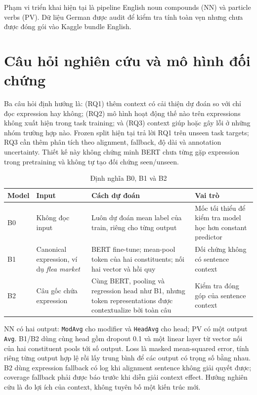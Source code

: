 \documentclass[11pt,a4paper]{article}
\newcommand{\code}[1]{\nolinkurl{#1}}
\begin{document}
Phạm vi triển khai hiện tại là pipeline English noun compounds (NN) và particle verbs (PV). Dữ liệu German được audit để kiểm tra tính toàn vẹn nhưng chưa được đóng gói vào Kaggle bundle English.

\section{Câu hỏi nghiên cứu và mô hình đối chứng}

Ba câu hỏi định hướng là: (RQ1) thêm context có cải thiện dự đoán so với chỉ đọc expression hay không; (RQ2) mô hình hoạt động thế nào trên expressions không xuất hiện trong task training; và (RQ3) context giúp hoặc gây lỗi ở những nhóm trường hợp nào. Frozen split hiện tại trả lời RQ1 trên unseen task targets; RQ3 cần thêm phân tích theo alignment, fallback, độ dài và annotation uncertainty. Thiết kế này không chứng minh BERT chưa từng gặp expression trong pretraining và không tự tạo đối chứng seen/unseen.

\begin{table}[htbp]
\centering
\caption{Định nghĩa B0, B1 và B2}
\small
\begin{tabularx}{\textwidth}{@{}p{}p{}YY@{}}
\toprule
Model & Input & Cách dự đoán & Vai trò \\
\midrule
B0 & Không đọc input & Luôn dự đoán mean label của train, riêng cho từng output & Mốc tối thiểu để kiểm tra model học hơn constant predictor \\
B1 & Canonical expression, ví dụ \emph{flea market} & BERT fine-tune; mean-pool token của hai constituents; nối hai vector và hồi quy & Đối chứng không có sentence context \\
B2 & Câu gốc chứa expression & Cùng BERT, pooling và regression head như B1, nhưng token representations được contextualize bởi toàn câu & Kiểm tra đóng góp của sentence context \\
\bottomrule
\end{tabularx}
\end{table}

NN có hai output: \code{ModAvg} cho modifier và \code{HeadAvg} cho head; PV có một output \code{Avg}. B1/B2 dùng cùng head gồm dropout 0.1 và một linear layer từ vector nối của hai constituent pools tới số output. Loss là masked mean-squared error, tính riêng từng output hợp lệ rồi lấy trung bình để các output có trọng số bằng nhau. B2 dùng expression fallback có log khi alignment sentence không giải quyết được; coverage fallback phải được báo trước khi diễn giải context effect. Hướng nghiên cứu là đo lợi ích của context, không tuyên bố một kiến trúc mới.
\end{document}
